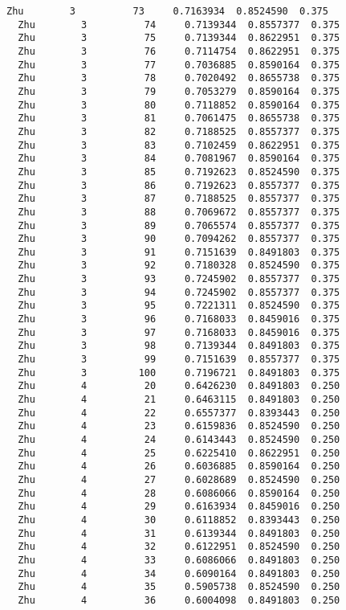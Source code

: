 \documentclass[11pt]{article}
\begin{document}
\begin{Verbatim}[commandchars=\\\{\}]
  Zhu        3          73     0.7163934  0.8524590  0.375
  Zhu        3          74     0.7139344  0.8557377  0.375
  Zhu        3          75     0.7139344  0.8622951  0.375
  Zhu        3          76     0.7114754  0.8622951  0.375
  Zhu        3          77     0.7036885  0.8590164  0.375
  Zhu        3          78     0.7020492  0.8655738  0.375
  Zhu        3          79     0.7053279  0.8590164  0.375
  Zhu        3          80     0.7118852  0.8590164  0.375
  Zhu        3          81     0.7061475  0.8655738  0.375
  Zhu        3          82     0.7188525  0.8557377  0.375
  Zhu        3          83     0.7102459  0.8622951  0.375
  Zhu        3          84     0.7081967  0.8590164  0.375
  Zhu        3          85     0.7192623  0.8524590  0.375
  Zhu        3          86     0.7192623  0.8557377  0.375
  Zhu        3          87     0.7188525  0.8557377  0.375
  Zhu        3          88     0.7069672  0.8557377  0.375
  Zhu        3          89     0.7065574  0.8557377  0.375
  Zhu        3          90     0.7094262  0.8557377  0.375
  Zhu        3          91     0.7151639  0.8491803  0.375
  Zhu        3          92     0.7180328  0.8524590  0.375
  Zhu        3          93     0.7245902  0.8557377  0.375
  Zhu        3          94     0.7245902  0.8557377  0.375
  Zhu        3          95     0.7221311  0.8524590  0.375
  Zhu        3          96     0.7168033  0.8459016  0.375
  Zhu        3          97     0.7168033  0.8459016  0.375
  Zhu        3          98     0.7139344  0.8491803  0.375
  Zhu        3          99     0.7151639  0.8557377  0.375
  Zhu        3         100     0.7196721  0.8491803  0.375
  Zhu        4          20     0.6426230  0.8491803  0.250
  Zhu        4          21     0.6463115  0.8491803  0.250
  Zhu        4          22     0.6557377  0.8393443  0.250
  Zhu        4          23     0.6159836  0.8524590  0.250
  Zhu        4          24     0.6143443  0.8524590  0.250
  Zhu        4          25     0.6225410  0.8622951  0.250
  Zhu        4          26     0.6036885  0.8590164  0.250
  Zhu        4          27     0.6028689  0.8524590  0.250
  Zhu        4          28     0.6086066  0.8590164  0.250
  Zhu        4          29     0.6163934  0.8459016  0.250
  Zhu        4          30     0.6118852  0.8393443  0.250
  Zhu        4          31     0.6139344  0.8491803  0.250
  Zhu        4          32     0.6122951  0.8524590  0.250
  Zhu        4          33     0.6086066  0.8491803  0.250
  Zhu        4          34     0.6090164  0.8491803  0.250
  Zhu        4          35     0.5905738  0.8524590  0.250
  Zhu        4          36     0.6004098  0.8491803  0.250

\end{Verbatim}
\end{document}
